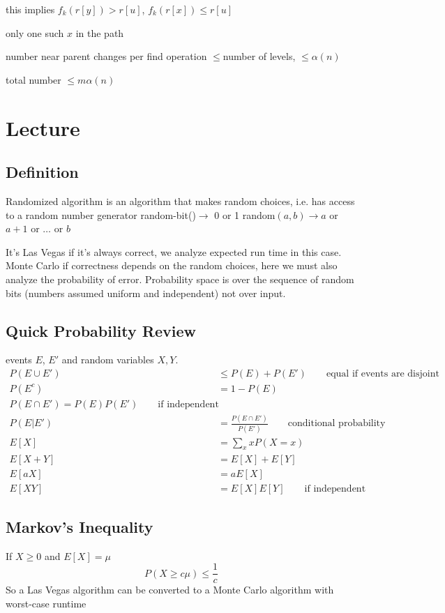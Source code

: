 \documentclass[english,12pt]{article}
\theoremstyle{plain}
\theoremstyle{definition}
\theoremstyle{definition} %
\begin{document}
this implies $f_k(r[y])> r[u]$, $f_k(r[x])\le r[u]$

only one such $x$ in the path

number near parent changes per find operation $\le$number of levels, $\le\alpha(n)$

total number $\le m\alpha(n)$

\section{Lecture}
\subsection{Definition}
Randomized algorithm is an algorithm that makes random choices, i.e. has access to a random number generator
random-bit()$\rightarrow$ 0 or 1
random$(a,b)\rightarrow a$ or $a+1$ or $\ldots$ or $b$

It's Las Vegas if it's always correct, we analyze expected run time in this case.  Monte Carlo if correctness depends on the random choices, here we must also analyze the probability of error.  Probability space is over the sequence of random bits (numbers assumed uniform and independent) not over input.

\subsection{Quick Probability Review}
events $E$, $E'$ and random variables $X, Y$.
\begin{align*}
P(E\cup E')&\le P(E) + P(E')\qquad \text{equal if events are disjoint}\\
P(E^c)&=1-P(E)\\
P(E\cap E')=P(E)P(E')\qquad \text{if independent}\\
P(E|E')&=\frac{P(E\cap E')}{P(E')}\qquad \text{conditional probability}\\
E\left[X\right] &=\sum_{x} x P(X=x)\\
E\left[X + Y\right] &=E\left[X\right]+E\left[Y\right]\\
E\left[aX\right]&= a E\left[X\right]\\
E\left[XY\right]&= E\left[X\right]E\left[Y\right]\qquad \text{if independent}
\end{align*}

\subsection{Markov's Inequality}
If $X\ge 0$ and $E\left[X\right]=\mu$ 
\[P(X\ge c\mu) \le \frac{1}{c}\]
So a Las Vegas algorithm can be converted to a Monte Carlo algorithm with worst-case runtime
\end{document}
